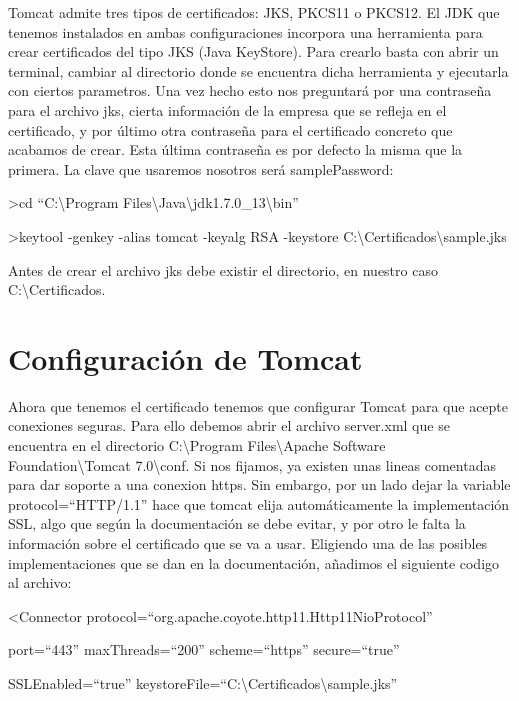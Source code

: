 \documentclass[a4paper]{article}
\begin{document}
Tomcat admite tres tipos de certificados: JKS, PKCS11 o PKCS12. El JDK que tenemos instalados en ambas configuraciones incorpora una herramienta para crear certificados del tipo JKS (Java KeyStore). Para crearlo basta con abrir un terminal, cambiar al directorio donde se encuentra dicha herramienta y ejecutarla con ciertos parametros. Una vez hecho esto nos preguntará por una contraseña para el archivo jks, cierta información de la empresa que se refleja en el certificado, y por último otra contraseña para el certificado concreto que acabamos de crear. Esta última contraseña es por defecto la misma que la primera. La clave que usaremos nosotros será samplePassword:

\noindent\colorbox{shadecolor}{\textgreater cd ``C:\textbackslash Program Files\textbackslash Java\textbackslash jdk1.7.0\_13\textbackslash bin''}

\noindent\colorbox{shadecolor}{\textgreater keytool -genkey -alias tomcat -keyalg RSA -keystore C:\textbackslash Certificados\textbackslash sample.jks}

Antes de crear el archivo jks debe existir el directorio, en nuestro caso C:\textbackslash Certificados.

\section{Configuración de Tomcat}

Ahora que tenemos el certificado tenemos que configurar Tomcat para que acepte conexiones seguras. Para ello debemos abrir el archivo server.xml que se encuentra en el directorio C:\textbackslash Program Files\textbackslash Apache Software Foundation\textbackslash Tomcat 7.0\textbackslash conf. Si nos fijamos, ya existen unas lineas comentadas para dar soporte a una conexion https. Sin embargo, por un lado dejar la variable protocol=``HTTP/1.1'' hace que tomcat elija automáticamente la implementación SSL, algo que según la documentación se debe evitar, y por otro le falta la información sobre el certificado que se va a usar. Eligiendo una de las posibles implementaciones que se dan en la documentación, añadimos el siguiente codigo al archivo:

\noindent\colorbox{shadecolor}{\textless Connector protocol=``org.apache.coyote.http11.Http11NioProtocol''}

\noindent\colorbox{shadecolor}{port=``443'' maxThreads=``200'' scheme=``https'' secure=``true''}

\noindent\colorbox{shadecolor}{SSLEnabled=``true'' keystoreFile=``C:\textbackslash Certificados\textbackslash sample.jks''}
\end{document}
